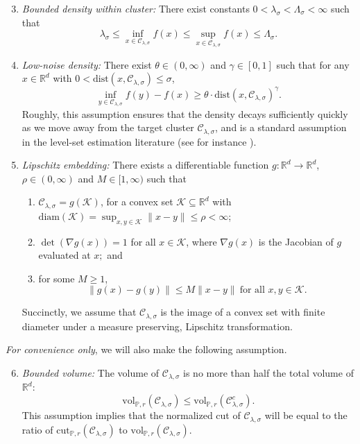 \documentclass[twoside,11pt]{article}
\newcommand{\Reals}{\mathbb{R}}
\newcommand{\1}{\mathbf{1}}
\newcommand{\Rd}{\Reals^d}
\newcommand{\mc}[1]{\mathcal{#1}}
\newcommand{\Pbb}{\mathbb{P}}
\newcommand{\dist}{\mathrm{dist}}
\newcommand{\vol}{\mathrm{vol}}
\newcommand{\cut}{\mathrm{cut}}
\begin{document}
\begin{enumerate}[label=(A\arabic*)]
	\setcounter{enumi}{2}
	\item
	\label{asmp:lambda_bounded_density}
	\emph{Bounded density within cluster:} There exist constants
	$0<\lambda_{\sigma}< \Lambda_{\sigma}<\infty$ such that 
	$$
	\lambda_{\sigma} \leq \inf_{x \in \mc{C}_{\lambda,\sigma}} f(x) \leq \sup_{x \in \mc{C}_{\lambda,\sigma}} f(x)
	\leq \Lambda_{\sigma}.
	$$
	
	\item 
	\label{asmp:low_noise_density}
	\emph{Low-noise density:} There exist $\theta \in (0,\infty)$ and $\gamma \in
	[0,1]$ such that for any $x \in \Rd$ with $0 < \dist(x, \mc{C}_{\lambda,\sigma}) \leq \sigma$,     
	$$
	\inf_{y \in \mc{C}_{\lambda,\sigma}} f(y) - f(x) \geq  \theta \cdot \dist(x, \mc{C}_{\lambda,\sigma})^{\gamma}.  
	$$
	Roughly, this assumption ensures that the density decays sufficiently quickly
	as we move away from the target cluster $\mc{C}_{\lambda,\sigma}$, and is a standard assumption in the level-set estimation literature (see for instance \citet{singh2009}).
	
	\item
	\label{asmp:embedding}
	\emph{Lipschitz embedding:}
	There exists a differentiable function $g: \Rd \to \Rd$, $\rho \in (0,\infty)$ and $M \in [1,\infty)$ such that
	\begin{enumerate}
		\item $\mc{C}_{\lambda,\sigma} = g(\mc{K})$, for a convex set $\mc{K} \subseteq \Rd$ with $\mathrm{diam}(\mc{K}) = \sup_{x,y \in \mc{K}}\|x - y\| \leq \rho < \infty$;
		\item $\det(\nabla g (x)) = 1$ for all $x \in \mc{K}$, where $\nabla g(x)$ is the Jacobian of $g$ evaluated at $x;$ and 
		\item for some $M \geq 1$,   
		$$
		\|g(x) - g(y)\| \leq M \|x - y\| ~	\text{for all $x,y \in \mc{K}$}. 
		$$
	\end{enumerate}
	Succinctly, we assume that $\mc{C}_{\lambda,\sigma}$ is the image of a convex set with finite
	diameter under a measure preserving, Lipschitz transformation. 
\end{enumerate}

\emph{For convenience only}, we will also make the following assumption.
\begin{enumerate}[label=(A\arabic*)]
	\setcounter{enumi}{5}
	\item
	\label{asmp:bounded_volume}
	\emph{Bounded volume:}
	The volume of $\mc{C}_{\lambda,\sigma}$ is no more than half the total volume of $\Rd$:
	$$
	\vol_{\Pbb,r}(\mc{C}_{\lambda,\sigma}) \leq \vol_{\Pbb,r}(\mc{C}_{\lambda,\sigma}^c). 
	$$
	This assumption implies that the normalized cut of $\mc{C}_{\lambda,\sigma}$ will be equal to the ratio of $\cut_{\Pbb,r}(\mc{C}_{\lambda,\sigma})$ to $\vol_{\Pbb,r}(\mc{C}_{\lambda,\sigma})$.
\end{enumerate}
\end{document}
